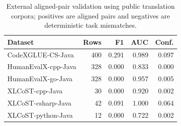 \begin{table}[!htbp]
\centering
\scriptsize
\begin{tabular}{lrrrr}
\toprule
Dataset & Rows & F1 & AUC & Conf. \\
\midrule
CodeXGLUE-CS-Java & 400 & 0.291 & 0.989 & 0.097 \\
HumanEvalX-cpp-Java & 328 & 0.000 & 0.833 & 0.000 \\
HumanEvalX-go-Java & 328 & 0.000 & 0.957 & 0.005 \\
XLCoST-cpp-Java & 30 & 0.000 & 0.920 & 0.002 \\
XLCoST-csharp-Java & 42 & 0.091 & 1.000 & 0.064 \\
XLCoST-python-Java & 12 & 0.000 & 0.722 & 0.002 \\
\bottomrule
\end{tabular}
\vspace{0.5em}
\caption{External aligned-pair validation using public translation corpora; positives are aligned pairs and negatives are deterministic task mismatches.}
\label{tab:external-validation}
\end{table}

